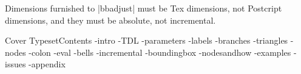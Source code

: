 Dimensions furnished to |bbadjust| must be Tex dimensions, not
Postcript dimensions, and they must be absolute, not incremental.


\bye
\get Cover
\get TypesetContents
-intro
-TDL
-parameters
-labels
-branches
-triangles
-nodes
-colon
-eval
-bells
-incremental
-boundingbox
-nodesandhow
-examples
-issues
-appendix

\bye

